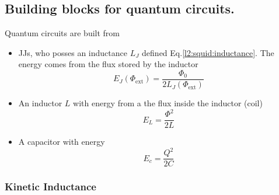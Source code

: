    \subsection{Building blocks for quantum circuits.}
   Quantum circuits are built from
   \begin{itemize}
   \item   JJs,    who   posses    an   inductance    $L_J$   defined
     Eq.\eqref{l2:squid:inductance}.  The energy  comes from the flux
     stored by the inductor
     \begin{equation}
       E_J(\Phi_\text{ext}) = \frac{\Phi_0}{2L_J(\Phi_\text{ext})}
     \end{equation}
   \item  An inductor  $L$ with  energy from  a the  flux inside  the
     inductor (coil)
     \begin{equation}
       E_L = \frac{\Phi^2}{2L}
     \end{equation}
   \item A capacitor with energy
     \begin{equation}
       E_c = \frac{Q^2}{2C}
     \end{equation}
   \end{itemize}

   \subsubsection{Kinetic Inductance}
   \label{sec:kinetic-inductance}


